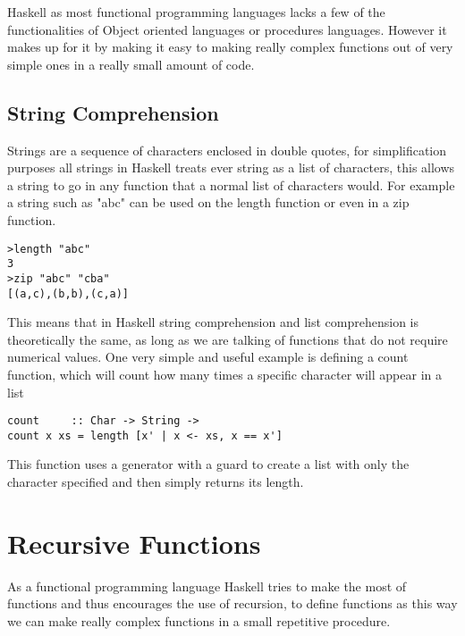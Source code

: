 \documentclass[12pt, oneside]{article}
\begin{document}
Haskell as most functional programming languages lacks a few of the functionalities of Object oriented languages or procedures languages. However it makes up for it by making it easy to making really complex functions out of very simple ones in a really small amount of code.

\subsection{String Comprehension}
Strings are a sequence of characters enclosed in double quotes, for simplification purposes all strings in Haskell treats ever string as a list of characters, this allows a string to go in any function that a normal list of characters would.
For example a string such as "abc" can be used on the length function or even in a zip function.
\begin{lstlisting}
>length "abc"
3
>zip "abc" "cba"
[(a,c),(b,b),(c,a)]
\end{lstlisting}

This means that in Haskell string comprehension and list comprehension is theoretically the same, as long as we are talking of functions that do not require numerical values. One very simple and useful example is defining a count function, which will count how many times a specific character will appear in a list
\begin{lstlisting}
count     :: Char -> String ->
count x xs = length [x' | x <- xs, x == x']
\end{lstlisting}
This function uses a generator with a guard to create a list with only the character specified and then simply returns its length.

\section{Recursive Functions}
As a functional programming language Haskell tries to make the most of functions and thus encourages the use of recursion, to define functions as this way we can make really complex functions in a small repetitive procedure.
\end{document}

